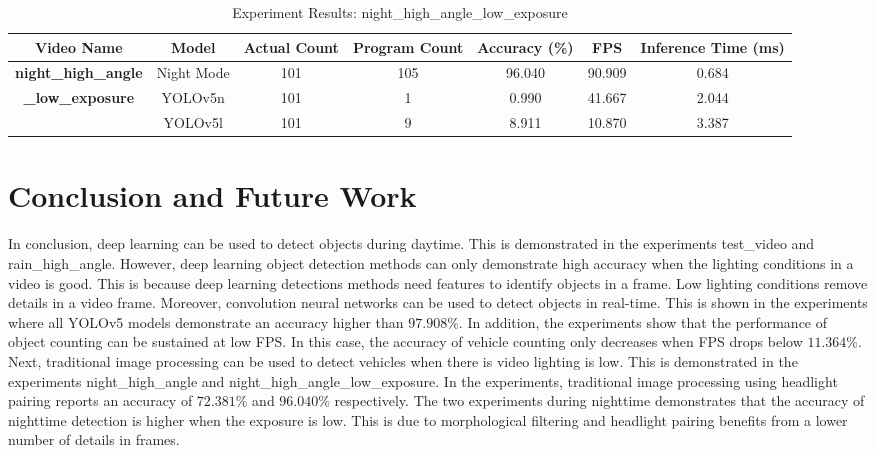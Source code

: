 \documentclass[12pt,a4paper,fleqn]{report}
\begin{document}
\begin{table}[htbp]
    \begin{adjustbox}{width=1\textwidth}
    \begin{tabular}{|c|c|c|c|c|c|c|}
    \hline
    \textbf{Video Name} & \textbf{Model} & \textbf{Actual Count} & \textbf{Program Count} & \textbf{Accuracy (\%)} & \textbf{FPS} & \textbf{Inference Time (ms)} \\ \hline
    \textbf{night\_high\_angle} & Night Mode & 101 & 105 & 96.040 & 90.909 & 0.684 \\ \cline{2-7}
    \textbf{\_low\_exposure} & YOLOv5n & 101 & 1 & 0.990 & 41.667 & 2.044 \\ \cline{2-7}
    & YOLOv5l & 101 & 9 & 8.911 & 10.870 & 3.387 \\ \hline
    \end{tabular}
    \end{adjustbox}
    \caption{Experiment Results: night\_high\_angle\_low\_exposure}
    \label{tab:result_nha_low_exp}
\end{table}

\chapter{Conclusion and Future Work}

In conclusion, deep learning can be used to detect objects during daytime.
This is demonstrated in the experiments test\_video and rain\_high\_angle.
However, deep learning object detection methods can only demonstrate high accuracy when the
lighting conditions in a video is good.
This is because deep learning detections methods need features to identify objects in a frame.
Low lighting conditions remove details in a video frame.
Moreover, convolution neural networks can be used to detect objects in real-time.
This is shown in the experiments where all YOLOv5 models demonstrate an accuracy higher than
$97.908\%$.
In addition, the experiments show that the performance of object counting can be sustained at low FPS.
In this case, the accuracy of vehicle counting only decreases when FPS drops below $11.364\%$.
Next, traditional image processing can be used to detect vehicles when there is video lighting is
low.
This is demonstrated in the experiments night\_high\_angle and night\_high\_angle\_low\_exposure.
In the experiments, traditional image processing using headlight pairing reports an accuracy of
$72.381\%$ and $96.040\%$ respectively.
The two experiments during nighttime demonstrates that the accuracy of nighttime detection is higher
when the exposure is low.
This is due to morphological filtering and headlight pairing benefits from a lower number of details
in frames.
\end{document}
